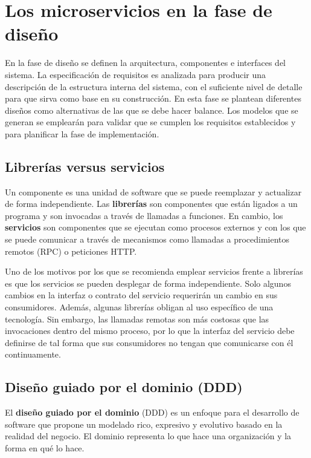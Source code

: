 \documentclass[11pt,spanish,listoffigures]{tfgetsinf}
\begin{document}
\section{Los microservicios en la fase de diseño} \label{sct:FaseDiseño}

En la fase de diseño se definen la arquitectura, componentes e interfaces del sistema. La especificación de requisitos es analizada para producir una descripción de la estructura interna del sistema, con el suficiente nivel de detalle para que sirva como base en su construcción. En esta fase se plantean diferentes diseños como alternativas de las que se debe hacer balance. Los modelos que se generan se emplearán para validar que se cumplen los requisitos establecidos y para planificar la fase de implementación. \cite{Bourque2014}

\subsection{Librerías versus servicios} \label{subsect:librerias}

Un componente es una unidad de software que se puede reemplazar y actualizar de forma independiente. Las \textbf{librerías} son componentes que están ligados a un programa y son invocadas a través de llamadas a funciones. En cambio, los \textbf{servicios} son componentes que se ejecutan como procesos externos y con los que se puede comunicar a través de mecanismos como llamadas a procedimientos remotos (RPC) o peticiones HTTP. \cite{Lewis2014}

Uno de los motivos por los que se recomienda emplear servicios frente a librerías es que los servicios se pueden desplegar de forma independiente. Solo algunos cambios en la interfaz o contrato del servicio requerirán un cambio en sus consumidores. Además, algunas librerías obligan al uso específico de una tecnología. Sin embargo, las llamadas remotas son más costosas que las invocaciones dentro del mismo proceso, por lo que la interfaz del servicio debe definirse de tal forma que sus consumidores no tengan que comunicarse con él continuamente.

\subsection{Diseño guiado por el dominio (DDD)}

El \textbf{diseño guiado por el dominio} (DDD) es un enfoque para el desarrollo de software que propone un modelado rico, expresivo y evolutivo basado en la realidad del negocio. El dominio representa lo que hace una organización y la forma en qué lo hace.
\end{document}
